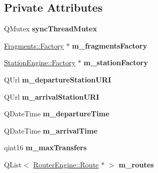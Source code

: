 \subsection*{Private Attributes}
\begin{DoxyCompactItemize}
\item 
\mbox{\label{classRouterEngine_1_1Planner_a300ad4d86bb8bee65a09d95ade239b04}} 
Q\+Mutex {\bfseries sync\+Thread\+Mutex}
\item 
\mbox{\label{classRouterEngine_1_1Planner_aa6ac71038550885954fb2ddc4016ec98}} 
\mbox{\hyperlink{classFragments_1_1Factory}{Fragments\+::\+Factory}} $\ast$ {\bfseries m\+\_\+fragments\+Factory}
\item 
\mbox{\label{classRouterEngine_1_1Planner_a859a3820c95133884c85050991072802}} 
\mbox{\hyperlink{classStationEngine_1_1Factory}{Station\+Engine\+::\+Factory}} $\ast$ {\bfseries m\+\_\+station\+Factory}
\item 
\mbox{\label{classRouterEngine_1_1Planner_ae76db90c07a6b5ea5034e534400f097f}} 
Q\+Url {\bfseries m\+\_\+departure\+Station\+U\+RI}
\item 
\mbox{\label{classRouterEngine_1_1Planner_aafdf34c8a3faf1eda36a42b89fb54000}} 
Q\+Url {\bfseries m\+\_\+arrival\+Station\+U\+RI}
\item 
\mbox{\label{classRouterEngine_1_1Planner_adcbafe913337cf8cc5b3bf685372d9d6}} 
Q\+Date\+Time {\bfseries m\+\_\+departure\+Time}
\item 
\mbox{\label{classRouterEngine_1_1Planner_acd8cb28d41f982c3e636270e58a1e096}} 
Q\+Date\+Time {\bfseries m\+\_\+arrival\+Time}
\item 
\mbox{\label{classRouterEngine_1_1Planner_a263254f46248fcf0fc9939dcfa34ac08}} 
qint16 {\bfseries m\+\_\+max\+Transfers}
\item 
\mbox{\label{classRouterEngine_1_1Planner_a07d50392392d758b092c2fc0f0b01230}} 
Q\+List$<$ \mbox{\hyperlink{classRouterEngine_1_1Route}{Router\+Engine\+::\+Route}} $\ast$ $>$ {\bfseries m\+\_\+routes}

\end{DoxyCompactItemize}
